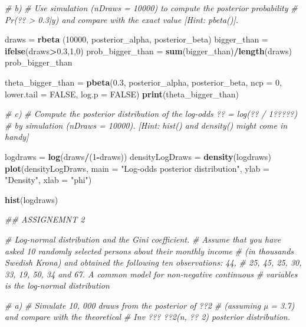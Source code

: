 \documentclass[]{article}
\newenvironment{Shaded}{\begin{snugshade}}{\end{snugshade}}
\newcommand{\CommentTok}[1]{\textcolor[rgb]{0.56,0.35,0.01}{\textit{#1}}}
\newcommand{\DataTypeTok}[1]{\textcolor[rgb]{0.13,0.29,0.53}{#1}}
\newcommand{\DecValTok}[1]{\textcolor[rgb]{0.00,0.00,0.81}{#1}}
\newcommand{\FloatTok}[1]{\textcolor[rgb]{0.00,0.00,0.81}{#1}}
\newcommand{\KeywordTok}[1]{\textcolor[rgb]{0.13,0.29,0.53}{\textbf{#1}}}
\newcommand{\NormalTok}[1]{#1}
\newcommand{\OperatorTok}[1]{\textcolor[rgb]{0.81,0.36,0.00}{\textbf{#1}}}
\newcommand{\OtherTok}[1]{\textcolor[rgb]{0.56,0.35,0.01}{#1}}
\newcommand{\StringTok}[1]{\textcolor[rgb]{0.31,0.60,0.02}{#1}}
\begin{document}
\begin{Shaded}
\begin{Highlighting}[]
\CommentTok{# b)}
\CommentTok{# Use simulation (nDraws = 10000) to compute the posterior probability }
\CommentTok{# Pr(?? > 0.3|y) and compare with the exact value [Hint: pbeta()].}

\NormalTok{draws =}\StringTok{ }\KeywordTok{rbeta}\NormalTok{ (}\DecValTok{10000}\NormalTok{, posterior_alpha, posterior_beta)}
\NormalTok{bigger_than =}\StringTok{ }\KeywordTok{ifelse}\NormalTok{(draws}\OperatorTok{>}\FloatTok{0.3}\NormalTok{,}\DecValTok{1}\NormalTok{,}\DecValTok{0}\NormalTok{)}
\NormalTok{prob_bigger_than =}\StringTok{ }\KeywordTok{sum}\NormalTok{(bigger_than)}\OperatorTok{/}\KeywordTok{length}\NormalTok{(draws)}
\NormalTok{prob_bigger_than}


\NormalTok{theta_bigger_than =}\StringTok{ }\KeywordTok{pbeta}\NormalTok{(}\FloatTok{0.3}\NormalTok{, posterior_alpha, posterior_beta, }\DataTypeTok{ncp =} \DecValTok{0}\NormalTok{, }\DataTypeTok{lower.tail =} \OtherTok{FALSE}\NormalTok{, }\DataTypeTok{log.p =} \OtherTok{FALSE}\NormalTok{)}
\KeywordTok{print}\NormalTok{(theta_bigger_than)}

\CommentTok{# c) }
\CommentTok{# Compute the posterior distribution of the log-odds ?? = log(?? / 1?????)}
\CommentTok{# by simulation (nDraws = 10000). [Hint: hist() and density() might come in handy]}

\NormalTok{logdraws =}\StringTok{ }\KeywordTok{log}\NormalTok{(draws}\OperatorTok{/}\NormalTok{(}\DecValTok{1}\OperatorTok{-}\NormalTok{draws))}
\NormalTok{densityLogDraws =}\StringTok{ }\KeywordTok{density}\NormalTok{(logdraws)}
\KeywordTok{plot}\NormalTok{(densityLogDraws,}
     \DataTypeTok{main =} \StringTok{"Log-odds posterior distribution"}\NormalTok{, }
     \DataTypeTok{ylab =} \StringTok{"Density"}\NormalTok{,}
     \DataTypeTok{xlab =} \StringTok{"phi"}\NormalTok{)}

\KeywordTok{hist}\NormalTok{(logdraws)}

\CommentTok{## ASSIGNEMNT 2}

\CommentTok{# Log-normal distribution and the Gini coefficient.}
\CommentTok{# Assume that you have asked 10 randomly selected persons about their monthly income}
\CommentTok{# (in thousands Swedish Krona) and obtained the following ten observations: 44,}
\CommentTok{# 25, 45, 25, 30, 33, 19, 50, 34 and 67. A common model for non-negative continuous}
\CommentTok{# variables is the log-normal distribution}

\CommentTok{# a)}
\CommentTok{# Simulate 10, 000 draws from the posterior of ??2}
\CommentTok{# (assuming µ = 3.7) and compare with the theoretical }
\CommentTok{# Inv ??? ??2(n, ?? 2) posterior distribution.}


\end{Highlighting}
\end{Shaded}
\end{document}
